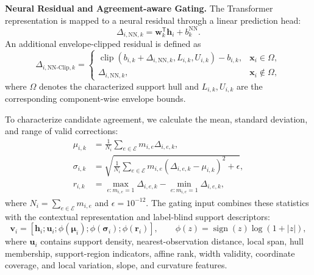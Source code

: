 \documentclass[conference,9pt,letterpaper]{IEEEtran}
\begin{document}
\textbf{Neural Residual and Agreement-aware Gating.}
The Transformer representation is mapped to a
neural residual through a linear prediction head:
\begin{equation}
\Delta_{i,\mathrm{NN},k}
=
\mathbf{w}_k^{\mathsf T}\mathbf{h}_i
+b_k^{\mathrm{NN}}.
\label{eq:neural_residual}
\end{equation}
An additional envelope-clipped residual is defined as
\begin{equation}
\Delta_{i,\mathrm{NN\text{-}Clip},k}
=
\begin{cases}
\operatorname{clip}
(b_{i,k}+\Delta_{i,\mathrm{NN},k},
L_{i,k},U_{i,k})-b_{i,k},
& \mathbf{x}_i\in\Omega,\\
\Delta_{i,\mathrm{NN},k},
& \mathbf{x}_i\notin\Omega,
\end{cases}
\label{eq:clipped_residual}
\end{equation}
where $\Omega$ denotes the characterized support
hull and $L_{i,k},U_{i,k}$ are the corresponding
component-wise envelope bounds.

To characterize candidate agreement, we calculate
the mean, standard deviation, and range of valid
corrections:
\begin{align}
\mu_{i,k}
&=
\frac{1}{N_i}
\sum_{e\in\mathcal{E}}
m_{i,e}\Delta_{i,e,k},\\
\sigma_{i,k}
&=
\sqrt{
\frac{1}{N_i}
\sum_{e\in\mathcal{E}}
m_{i,e}(\Delta_{i,e,k}-\mu_{i,k})^2
+\epsilon
},\\
r_{i,k}
&=
\max_{e:m_{i,e}=1}\Delta_{i,e,k}
-
\min_{e:m_{i,e}=1}\Delta_{i,e,k},
\end{align}
where $N_i=\sum_{e\in\mathcal{E}}m_{i,e}$ and
$\epsilon=10^{-12}$. The gating input combines
these statistics with the contextual representation
and label-blind support descriptors:
\begin{equation}
\mathbf{v}_i=
[
\mathbf{h}_i;
\mathbf{u}_i;
\phi(\boldsymbol{\mu}_i);
\phi(\boldsymbol{\sigma}_i);
\phi(\mathbf{r}_i)
],
\qquad
\phi(z)=\operatorname{sign}(z)\log(1+|z|),
\label{eq:gating_input}
\end{equation}
where $\mathbf{u}_i$ contains support density,
nearest-observation distance, local span,
hull membership, support-region indicators,
affine rank, width validity, coordinate coverage,
and local variation, slope, and curvature features.
\end{document}
